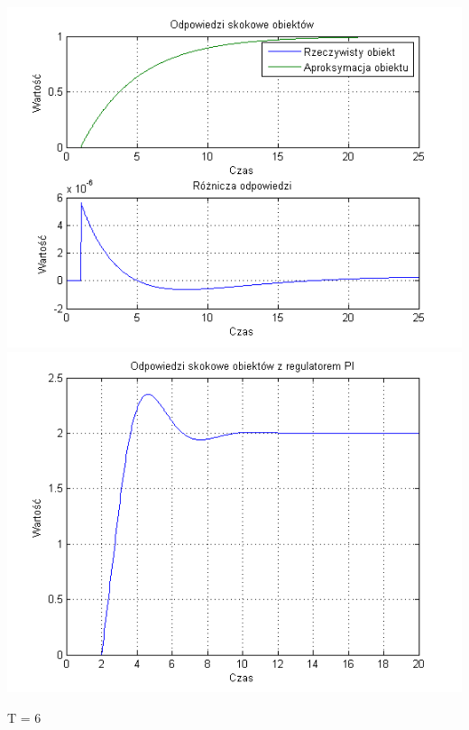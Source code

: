 \documentclass[10pt,a4paper]{article}
\begin{document}
\begin{center}
\includegraphics[scale=1]{images/jeden/skrypt_23.png}\\
\includegraphics[scale=1]{images/jeden/skrypt_24.png}\\
\end{center}
\newpage
T = 6
\end{document}

